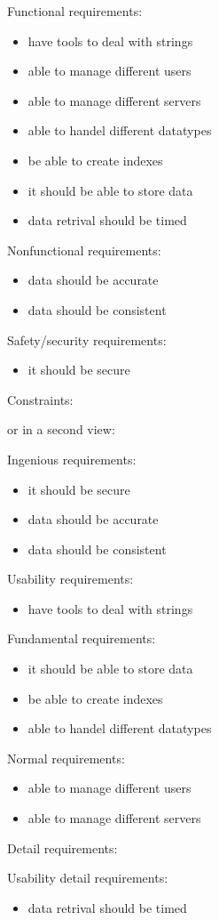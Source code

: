 \begin{elenco}
\item Functional requirements:
\begin{itemize}
    \item have tools to deal with strings
    \item able to manage different users
    \item able to manage different servers
    \item able to handel different datatypes
    \item be able to create indexes
    \item it should be able to store data
    \item data retrival should be timed
\end{itemize}
\item Nonfunctional requirements:
\begin{itemize}
    \item data should be accurate
    \item data should be consistent
\end{itemize}
\item Safety/security requirements:\\
\begin{itemize}
	\item it should be secure
\end{itemize}

Constraints:

or in a second view:

Ingenious requirements:
\begin{itemize}
    \item it should be secure
    \item data should be accurate
    \item data should be consistent
\end{itemize}
 Usability requirements: \\
\begin{itemize}
    \item have tools to deal with strings
\end{itemize}
Fundamental requirements:
\begin{itemize}
    \item it should be able to store data
    \item be able to create indexes
    \item able to handel different datatypes
\end{itemize}
Normal requirements:
\begin{itemize}
    \item able to manage different users
    \item able to manage different servers
\end{itemize}
    \item Detail requirements:
    \item Usability detail requirements:
\begin{itemize}
    \item data retrival should be timed
\end{itemize}
\end{elenco}  
  
